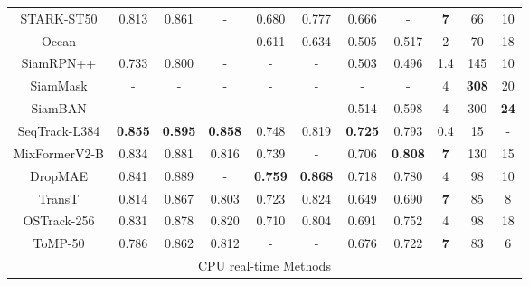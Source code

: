 \begin{table}
{\begin{tabular}{c |c c  c |c c |c c |c c c}
	STARK-ST50 \cite{yan2021learning}         & 0.813  & 0.861  & - & 0.680  & 0.777 & 0.666  & -  & \bf{7} & 66 & 10\\
	Ocean \cite{zhang2020ocean}               & -  & -  & - & 0.611  & 0.634  & 0.505  & 0.517 & 2  & 70 & 18\\
	SiamRPN++ \cite{li2019siamrpn++}          & 0.733  & 0.800  & - & -  &  - & 0.503  & 0.496  & 1.4 & 145 & 10 \\
	SiamMask \cite{wang2019fast}              & -  & - & -  & -  & - & - & -  & 4 & \bf{308} & 20 \\
	SiamBAN \cite{chen2020siamese}            & -  & -  & - & -  & - & 0.514  & 0.598 & 4 & 300 & \bf{24} \\
	SeqTrack-L384 \cite{chen2023seqtrack}     & \bf{0.855}  & \bf{0.895}  & \bf{0.858} & 0.748  & 0.819  & \bf{0.725}  & 0.793  & 0.4 & 15 & -\\
	MixFormerV2-B \cite{cui2024mixformerv2}   & 0.834  & 0.881  & 0.816 & 0.739  & -  & 0.706  & \bf{0.808}  & \bf{7} & 130 & 15 \\
	DropMAE \cite{wu2023dropmae}              & 0.841  & 0.889  & - & \bf{0.759}  & \bf{0.868}  & 0.718  & 0.780  & 4 & 98 & 10 \\
	TransT \cite{chen2021transformer}         & 0.814  & 0.867  & 0.803 & 0.723  & 0.824   & 0.649  & 0.690  & \bf{7} & 85 & 8 \\
	OSTrack-256 \cite{ye2022joint}            & 0.831  & 0.878  & 0.820 & 0.710  & 0.804  & 0.691  & 0.752 & 4 & 98 & 18 \\
	ToMP-50 \cite{mayer2022transforming}      & 0.786  & 0.862  & 0.812 & -  & - & 0.676  & 0.722  & \bf{7} & 83 & 6 \\
	
	\hline
	\multicolumn{11}{c}{CPU real-time Methods} \\
	\hline  
	

\end{tabular}}
\end{table}
